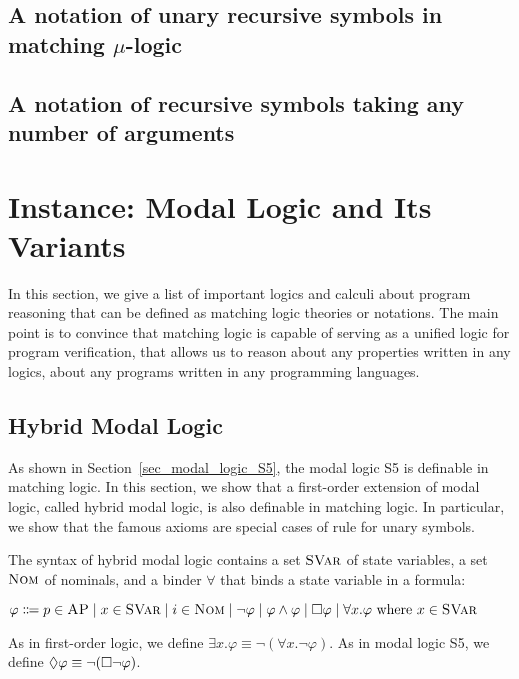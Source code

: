 \documentclass{amsart}
\begin{document}
\subsection{A notation of unary recursive symbols in matching $\mu$-logic}

\subsection{A notation of recursive symbols taking any number of arguments}


\section{Instance: Modal Logic and Its Variants}

In this section, we give a list of important logics and calculi about
program reasoning that can be defined as matching logic theories or notations.
The main point is to convince that matching logic is capable of
serving as a unified logic for program verification,
that allows us to reason about any properties written in any logics,
about any programs written in any programming languages.

\subsection{Hybrid Modal Logic}
\label{sec_hybrid_modal_logic}

As shown in Section~\ref{sec_modal_logic_S5},
the modal logic S5 is definable in matching logic.
In this section, we show that
a first-order extension of modal logic, called hybrid modal logic,
is also definable in matching logic.
In particular, we show that the famous  axioms are special cases
of rule \propagationexists for unary symbols.

The syntax of hybrid modal logic contains
a set ${\normalfont\textsc{SVar}}$ of state variables,
a set $\textnormal{\textsc{Nom}}$ of nominals,
and a binder $\forall$ that binds a state variable in a formula:
\begin{center}
	$\varphi \Coloneqq
	p \in \textsc{AP} \mid x \in {\normalfont\textsc{SVar}} \mid i \in \textnormal{\textsc{Nom}} \mid
	\neg \varphi \mid \varphi \wedge \varphi \mid
	{\square} \varphi \mid \forall x . \varphi \text{ where $x \in {\normalfont\textsc{SVar}}$}
	$
\end{center}
As in first-order logic,
we define $\exists x . \varphi \equiv \neg (\forall x . \neg \varphi)$.
As in modal logic S5,
we define ${\lozenge} \varphi \equiv \neg ({\square} \neg \varphi)$.
\end{document}
